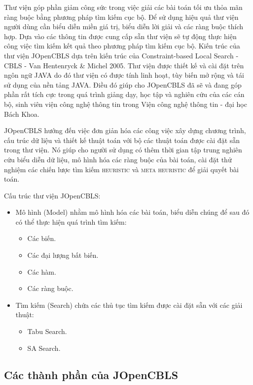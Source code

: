 Thư viện góp phần giảm công sức trong việc giải các bài toán tối ưu thỏa mãn ràng buộc bằng phương pháp tìm kiếm cục bộ. Để sử dụng hiệu quả thư viện người dùng cần biểu diễn miền giá trị, biểu diễn lời giải và các ràng buộc thích hợp. Dựa vào các thông tin được cung cấp sẵn thư viện sẽ tự động thực hiện công việc tìm kiếm kết quả theo phương pháp \textsf{tìm kiếm cục bộ}. Kiến trúc của thư viện JOpenCBLS dựa trên kiến trúc của \textsf{Constraint-based Local Search - CBLS} - \textsf{Van Hentenryck \& Michel 2005}. Thư viện được thiết kế và cài đặt trên ngôn ngữ JAVA do đó thư viện có được tính linh hoạt, tùy biến mở rộng và tái sử dụng của nền tảng JAVA. Điều đó giúp cho JOpenCBLS đã sẽ và đang góp phần rất tích cực trong quá trình giảng dạy, học tập và nghiên cứu của các cán bộ, sinh viên viện công nghệ thông tin trong Viện công nghệ thông tin - đại học Bách Khoa.

JOpenCBLS hướng đến việc đơn giản hóa các công việc xây dựng chương trình, cấu trúc dữ liệu và thiết kế thuật toán với bộ các thuật toán được cài đặt sẵn trong thư viện. Nó giúp cho người sử dụng có thêm thời gian tập trung nghiên cứu biểu diễn dữ liệu, mô hình hóa các ràng buộc của bài toán, cài đặt thử nghiệm các chiến lược tìm kiếm \textsc{heuristic} và \textsc{meta heuristic} để giải quyết bài toán.

Cấu trúc thư viện JOpenCBLS:
\begin{itemize}
	\item Mô hình (Model) nhằm mô hình hóa các bài toán, biểu diễn chúng để sau đó có thể thực hiện quá trình tìm kiếm:
	\begin{itemize}
		\item Các biến.
		\item Các đại lượng bất biến.
		\item Các hàm.
		\item Các ràng buộc.
	\end{itemize}
	\item Tìm kiếm (Search) chứa các thủ tục tìm kiếm được cài đặt sẵn với các giải thuật:
	\begin{itemize}
		\item Tabu Search.
		\item SA Search.
	\end{itemize}
\end{itemize}

\subsection{Các thành phần của JOpenCBLS}


